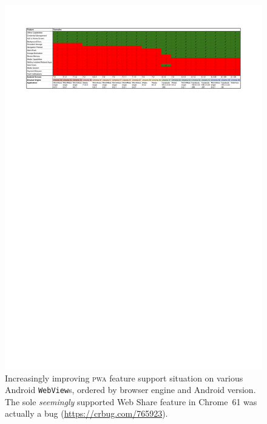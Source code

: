 \documentclass[sigconf]{acmart}
\begin{document}
\begin{figure}[t]
  \setcounter{figure}{0}
  \renewcommand{\figurename}{Table}
  \begin{center}
  \centerline{\includegraphics[trim=1.5cm 22.85cm 1.5cm 1.5cm, clip]{webview-results.pdf}}
  \caption{Increasingly improving \textsc{pwa} feature support situation
    on various Android \texttt{WebView}s, ordered by browser engine and Android version.
    The sole \emph{seemingly} supported Web Share feature in Chrome~61
    was actually a bug (\url{https://crbug.com/765923}).}
  \label{table:webview}
  \end{center}
\end{figure}
\end{document}
